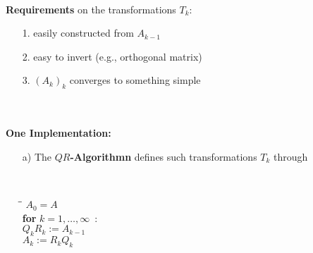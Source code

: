 \begin{frame}
	~\\
\textbf{Requirements} on the transformations $T_k$:
		\begin{itemize}
			\item[1.] easily constructed from $A_{k-1}$
			\item[2.] easy to invert (e.g., orthogonal matrix)
			\item[3.] $(A_k)_k$ converges to something simple
	\end{itemize}
~\\~\\
	 \textbf{One Implementation:}
	 \begin{itemize}
	 	\item[a)] The \textbf{\color{yellow}$QR$-Algorithmn} defines such transformations $T_k$ through\\ \vspace{-0.15cm}
	 	\begin{minipage}{0.3\textwidth}
	 		~
	 	\end{minipage}
	 	\begin{minipage}[c]{0.6\textwidth}
	 		\vspace{0.2cm}
	 		\begin{tabbing}
	 			\qquad \= \qquad \= \qquad \kill
	 			$A_0=A$\\
	 			\textbf{for} $k=1,\ldots ,\infty$\ : \\[0.3em]
	 			\> $Q_{k}R_{k}:=A_{k-1}$ \\[0.3em]
	 			\> $A_{k}:=R_{k}Q_{k}$ 
	 		\end{tabbing}	 
	 	\end{minipage}
	 	~\\~\\~\\ \vspace{0.2cm}
	 \end{itemize}
\end{frame}




